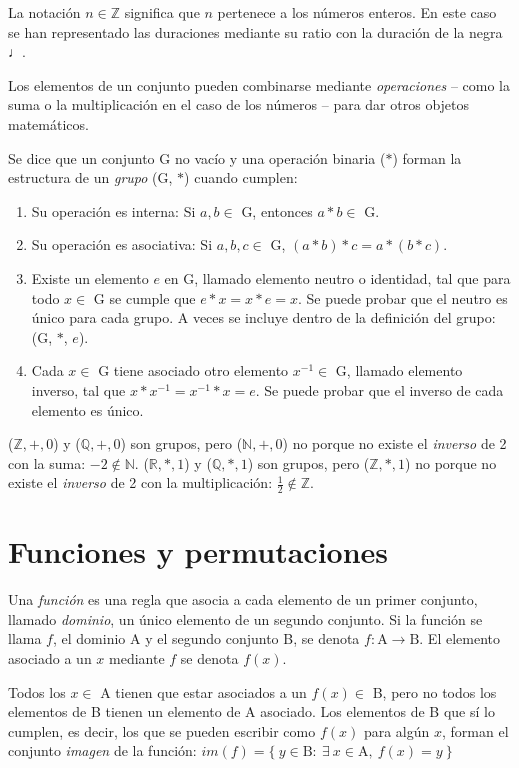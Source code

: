 		La notación $n\in\mathbb{Z}$ significa que $n$ pertenece a los números enteros. En este caso se han representado las duraciones mediante su ratio con la duración de la negra $\quarternote$.
	
		Los elementos de un conjunto pueden combinarse mediante \emph{operaciones} -- como la suma o la multiplicación en el caso de los números -- para dar otros objetos matemáticos. 
		
		Se dice que un conjunto G no vacío y una operación binaria ($\ast$) forman la estructura de un \emph{grupo} (G, $\ast$) cuando cumplen:
	
		\begin{enumerate}
			\item{Su operación es interna: Si $a,b\in$ G, entonces $a\ast b\in$ G.}		
			\item{Su operación es asociativa: Si $a,b,c\in$ G, $(a\ast b)\ast c=a\ast(b\ast c)$. }
			\item{Existe un elemento $e$ en G, llamado elemento neutro o identidad, tal que para todo $x\in$ G se cumple que $e\ast x = x\ast e = x$. Se puede probar que el neutro es único para cada grupo. A veces se incluye dentro de la definición del grupo: (G, $\ast$, $e$).}
			\item{Cada $x\in$ G tiene asociado otro elemento $x^{-1}\in$ G, llamado elemento inverso, tal que $x \ast x^{-1} = x^{-1}  \ast x = e$. Se puede probar que el inverso de cada elemento es único.}		
		\end{enumerate}
	
	($\mathbb{Z},+,0$) y ($\mathbb{Q},+,0$) son grupos, pero ($\mathbb{N},+,0$) no porque no existe el \textit{inverso} de 2 con la suma: $-2\notin\mathbb{N}$. ($\mathbb{R},*,1$) y ($\mathbb{Q},*,1$) son grupos, pero ($\mathbb{Z},*,1$) no porque no existe el \textit{inverso} de 2 con la multiplicación: $\frac12\notin\mathbb{Z}$.
	
	\section{Funciones y permutaciones}
		Una \emph{función} es una regla que asocia a cada elemento de un primer conjunto, llamado \emph{dominio}, un único elemento de un segundo conjunto. Si la función se llama $f$, el dominio A y el segundo conjunto B, se denota $f:\text{A}\to \text{B}$. El elemento asociado a un $x$ mediante $f$ se denota $f(x)$.
		
		Todos los $x\in$ A tienen que estar asociados a un $f(x)\in$ B, pero no todos los elementos de B tienen un elemento de A asociado. Los elementos de B que sí lo cumplen, es decir, los que se pueden escribir como $f(x)$ para algún $x$, forman el conjunto \emph{imagen} de la función: $im(f)=\{\ y\in \text{B}:\ \exists\ x \in \text{A},\ f(x)=y\ \}$
		
